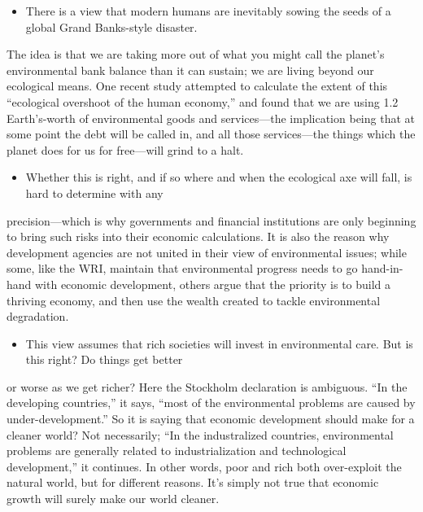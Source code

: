 \documentclass[UTF8,11pt]{ctexart}
\begin{document}
\begin{itemize}[leftmargin=2em,itemsep=.2em,topsep=.4em]\item[J.] There is a view that modern humans are inevitably sowing the seeds of a global Grand Banks-style disaster.
\end{itemize}

The idea is that we are taking more out of what you might call the planet’s environmental bank balance than it can sustain; we are living beyond our ecological means. One recent study attempted to calculate the extent of this “ecological overshoot of the human economy,” and found that we are using 1.2 Earth’s-worth of environmental goods and services—the implication being that at some point the debt will be called in, and all those services—the things which the planet does for us for free—will grind to a halt.


\begin{itemize}[leftmargin=2em,itemsep=.2em,topsep=.4em]\item[K.] Whether this is right, and if so where and when the ecological axe will fall, is hard to determine with any
\end{itemize}

precision—which is why governments and financial institutions are only beginning to bring such risks into their economic calculations. It is also the reason why development agencies are not united in their view of environmental issues; while some, like the WRI, maintain that environmental progress needs to go hand-in-hand with economic development, others argue that the priority is to build a thriving economy, and then use the wealth created to tackle environmental degradation.


\begin{itemize}[leftmargin=2em,itemsep=.2em,topsep=.4em]\item[L.] This view assumes that rich societies will invest in environmental care. But is this right? Do things get better
\end{itemize}

or worse as we get richer? Here the Stockholm declaration is ambiguous. “In the developing countries,” it says, “most of the environmental problems are caused by under-development.” So it is saying that economic development should make for a cleaner world? Not necessarily; “In the industralized countries, environmental problems are generally related to industrialization and technological development,” it continues. In other words, poor and rich both over-exploit the natural world, but for different reasons. It’s simply not true that economic growth will surely make our world cleaner.
\end{document}
